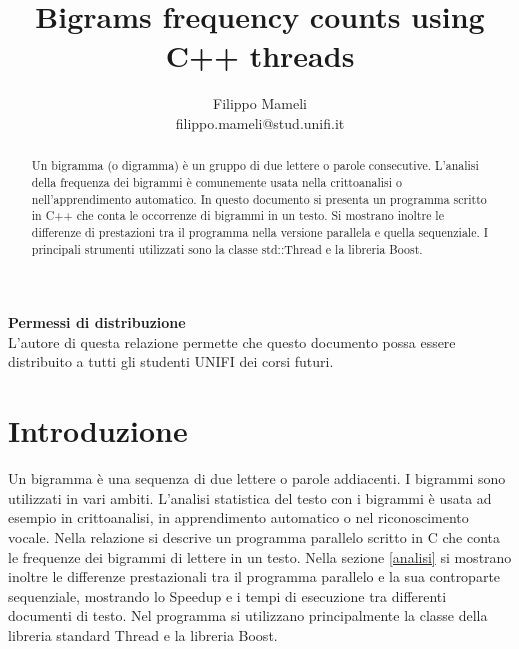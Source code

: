 \documentclass[10pt,twocolumn,letterpaper]{article}
\newcommand{\Rplus}{\protect\hspace{-.1em}\protect\raisebox{.35ex}{\smaller{\smaller\textbf{+}}}}
\newcommand{\CC}{\mbox{C\Rplus\Rplus}\xspace}
\begin{document}
\title{Bigrams frequency counts using C++ threads}

\author{Filippo Mameli\\
filippo.mameli@stud.unifi.it
}

\maketitle
\thispagestyle{empty}

\begin{abstract}
  Un bigramma (o digramma) è un gruppo di due lettere o parole consecutive.
  L'analisi della frequenza dei bigrammi è comunemente usata nella crittoanalisi o nell'apprendimento automatico.
  In questo documento si presenta un programma scritto in C++ che conta le occorrenze di bigrammi in un testo.
  Si mostrano inoltre le differenze di prestazioni tra il programma nella versione parallela e quella sequenziale.
  I principali strumenti utilizzati sono la classe std::Thread e la libreria Boost.
\end{abstract}

\noindent\large\textbf{Permessi di distribuzione}\\
\indent L'autore di questa relazione permette che questo documento possa essere distribuito a tutti gli studenti UNIFI dei corsi futuri.

\section{Introduzione}
Un bigramma è una sequenza di due lettere o parole addiacenti. I bigrammi sono utilizzati in vari ambiti.
L'analisi statistica del testo con i bigrammi è usata ad esempio in crittoanalisi, in apprendimento automatico o nel riconoscimento vocale.
Nella relazione si descrive un programma parallelo scritto in \CC che conta le frequenze dei bigrammi di lettere in un testo.
Nella sezione \ref{analisi} si mostrano inoltre le differenze prestazionali tra il programma parallelo e la sua controparte sequenziale, mostrando
lo Speedup e i tempi di esecuzione tra differenti documenti di testo.
Nel programma si utilizzano principalmente la classe della libreria standard Thread e la libreria Boost.
\vspace{3cm}

\end{document}

